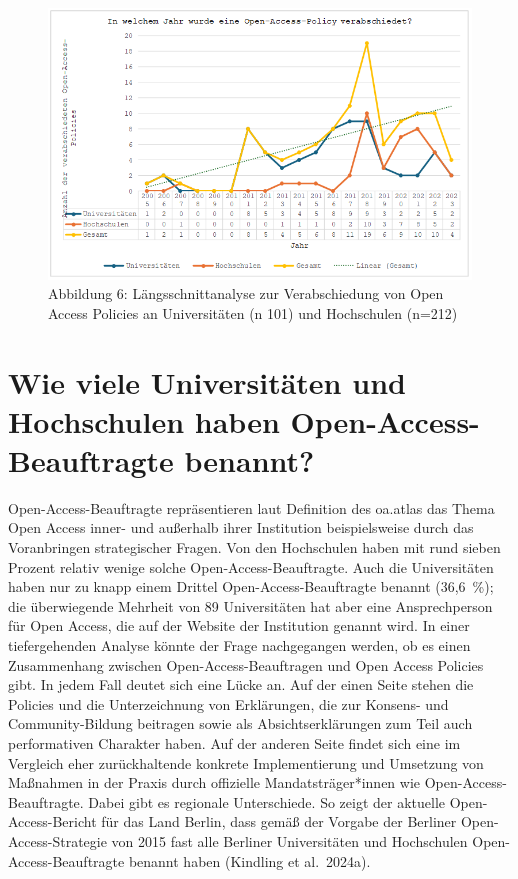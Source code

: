 \documentclass[a4paper,
fontsize=11pt,
oneside,
numbers=noperiodatend,
parskip=half-,
bibliography=totoc,
final
]{scrartcl}
\begin{document}
\begin{figure}[H]
\centering
\includegraphics[width=1\textwidth]{img/image006.png}
\caption{Abbildung 6: Längsschnittanalyse zur Verabschiedung von Open Access Policies an Universitäten (n 101) und Hochschulen (n=212)}
\end{figure}

\section{Wie viele Universitäten und Hochschulen haben
Open-Access-Beauftragte
benannt?}\label{wie-viele-universituxe4ten-und-hochschulen-haben-open-access-beauftragte-benannt}

Open-Access-Beauftragte repräsentieren laut Definition des oa.atlas das
Thema Open Access inner- und außerhalb ihrer Institution beispielsweise
durch das Voranbringen strategischer Fragen. Von den Hochschulen haben
mit rund sieben Prozent relativ wenige solche Open-Access-Beauftragte.
Auch die Universitäten haben nur zu knapp einem Drittel
Open-Access-Beauftragte benannt (36,6~\%); die überwiegende Mehrheit von
89 Universitäten hat aber eine Ansprechperson für Open Access, die auf
der Website der Institution genannt wird. In einer tiefergehenden
Analyse könnte der Frage nachgegangen werden, ob es einen Zusammenhang
zwischen Open-Access-Beauftragen und Open Access Policies gibt. In jedem
Fall deutet sich eine Lücke an. Auf der einen Seite stehen die Policies
und die Unterzeichnung von Erklärungen, die zur Konsens- und
Community-Bildung beitragen sowie als Absichtserklärungen zum Teil auch
performativen Charakter haben. Auf der anderen Seite findet sich eine im
Vergleich eher zurückhaltende konkrete Implementierung und Umsetzung von
Maßnahmen in der Praxis durch offizielle Mandatsträger*innen wie
Open-Access-Beauftragte. Dabei gibt es regionale Unterschiede. So zeigt
der aktuelle Open-Access-Bericht für das Land Berlin, dass gemäß der
Vorgabe der Berliner Open-Access-Strategie von 2015 fast alle Berliner
Universitäten und Hochschulen Open-Access-Beauftragte benannt haben
(Kindling et al.~2024a).
\end{document}
